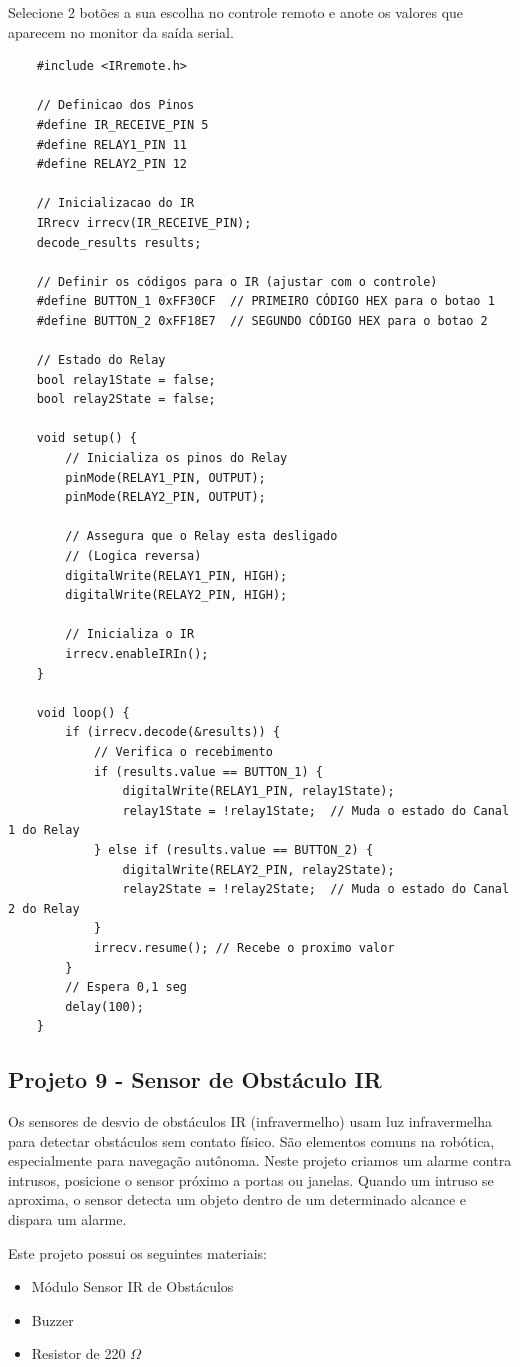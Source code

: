 \documentclass[a4paper,11pt]{article}
\begin{document}
Selecione 2 botões a sua escolha no controle remoto e anote os valores que aparecem no monitor da saída serial.

\begin{lstlisting}
	#include <IRremote.h>
	
	// Definicao dos Pinos
	#define IR_RECEIVE_PIN 5
	#define RELAY1_PIN 11
	#define RELAY2_PIN 12
	
	// Inicializacao do IR
	IRrecv irrecv(IR_RECEIVE_PIN);
	decode_results results;
	
	// Definir os códigos para o IR (ajustar com o controle)
	#define BUTTON_1 0xFF30CF  // PRIMEIRO CÓDIGO HEX para o botao 1
	#define BUTTON_2 0xFF18E7  // SEGUNDO CÓDIGO HEX para o botao 2
	
	// Estado do Relay
	bool relay1State = false;
	bool relay2State = false;
	
	void setup() {
		// Inicializa os pinos do Relay
		pinMode(RELAY1_PIN, OUTPUT);
		pinMode(RELAY2_PIN, OUTPUT);
		
		// Assegura que o Relay esta desligado
		// (Logica reversa)
		digitalWrite(RELAY1_PIN, HIGH);
		digitalWrite(RELAY2_PIN, HIGH);
		
		// Inicializa o IR
		irrecv.enableIRIn();
	}
	
	void loop() {
		if (irrecv.decode(&results)) {
			// Verifica o recebimento
			if (results.value == BUTTON_1) {
				digitalWrite(RELAY1_PIN, relay1State);
				relay1State = !relay1State;  // Muda o estado do Canal 1 do Relay
			} else if (results.value == BUTTON_2) {
				digitalWrite(RELAY2_PIN, relay2State);
				relay2State = !relay2State;  // Muda o estado do Canal 2 do Relay
			}
			irrecv.resume(); // Recebe o proximo valor
		}
		// Espera 0,1 seg
		delay(100);
	}	
\end{lstlisting}

\subsection{Projeto 9 - Sensor de Obstáculo IR}
Os sensores de desvio de obstáculos IR (infravermelho) usam luz infravermelha para detectar obstáculos sem contato físico. São elementos comuns na robótica, especialmente para navegação autônoma. Neste projeto criamos um alarme contra intrusos, posicione o sensor próximo a portas ou janelas. Quando um intruso se aproxima, o sensor detecta um objeto dentro de um determinado alcance e dispara um alarme.

Este projeto possui os seguintes materiais: \vspace{-1em}
\begin{itemize}
	\item Módulo Sensor IR de Obstáculos
	\item Buzzer
	\item Resistor de 220 $\Omega$
\end{itemize}
\end{document}
